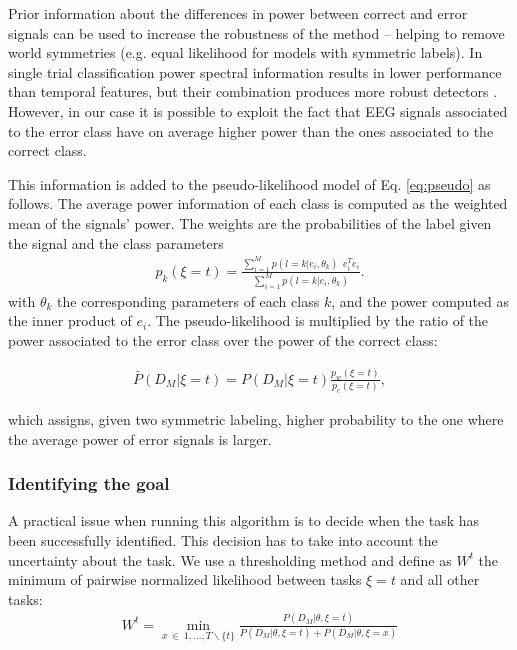 Prior information about the differences in power between correct and error signals can be used to increase the robustness of the method -- helping to remove world symmetries (e.g. equal likelihood for models with symmetric labels).
In single trial classification power spectral information results in lower performance than temporal features, but their combination produces more robust detectors \cite{Omedes13ErrPFreq}.
%
However, in our case it is possible to exploit the fact that EEG signals associated to the error class have on average higher power than the ones associated to the correct class.

This information is added to the pseudo-likelihood model of Eq. \ref{eq:pseudo} as follows. The average power information of each class is computed as  the weighted mean of the signals' power. The weights are the probabilities of the label given the signal and the class parameters
%
\begin{eqnarray}
p_k(\xi=t) = \frac{\sum_{i = 1}^{M} p(l = k | e_i , \theta_k) ~~ e_i^T e_i}{\sum_{i = 1}^{M} p(l = k | e_i , \theta_k)}.
\label{eq:powerCorrect}
\end{eqnarray}
%
with $\theta_k$ the corresponding parameters of each class $k$, and the power computed as the inner product of $e_i$.
%
The pseudo-likelihood is multiplied by the ratio of the power associated to the error class over the power of the correct class:

\begin{eqnarray}
 \bar{P}(D_M | \xi=t) = P(D_M | \xi=t) \frac{p_w(\xi=t)}{p_c(\xi=t)},
\label{eq:power}
\end{eqnarray}

which assigns, given two symmetric labeling, higher probability to the one where the average power of error  signals is larger.

\subsubsection{Identifying the goal}
\label{sec:confidence}
A practical issue when running this algorithm is to decide when the task has been successfully identified. This decision has to take into account the uncertainty about the task. We use a thresholding method and define as $W^{t}$ the minimum of pairwise normalized likelihood between tasks $\xi=t$ and all other tasks:
%
\begin{eqnarray}
W^{t} = \min_{x~\in~{1, \ldots, T} \smallsetminus \{t\}} \frac{P(D_M | \theta, \xi=t)}{P(D_M | \theta, \xi=t) + P(D_M | \theta, \xi=x)}
\label{eq:weight}
\end{eqnarray}

